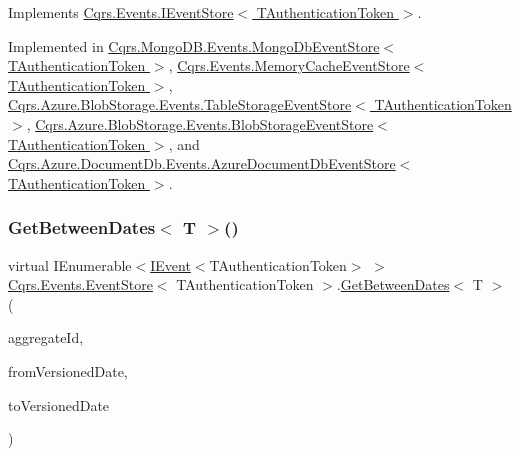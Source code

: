 Implements \hyperlink{interfaceCqrs_1_1Events_1_1IEventStore_a0575ba2cce945342dc261eb2286c8a41_a0575ba2cce945342dc261eb2286c8a41}{Cqrs.\+Events.\+I\+Event\+Store$<$ T\+Authentication\+Token $>$}.



Implemented in \hyperlink{classCqrs_1_1MongoDB_1_1Events_1_1MongoDbEventStore_a95637f6bebb94d505a6b3020275cfdf9_a95637f6bebb94d505a6b3020275cfdf9}{Cqrs.\+Mongo\+D\+B.\+Events.\+Mongo\+Db\+Event\+Store$<$ T\+Authentication\+Token $>$}, \hyperlink{classCqrs_1_1Events_1_1MemoryCacheEventStore_ac57321649252167214d1661a578c6421_ac57321649252167214d1661a578c6421}{Cqrs.\+Events.\+Memory\+Cache\+Event\+Store$<$ T\+Authentication\+Token $>$}, \hyperlink{classCqrs_1_1Azure_1_1BlobStorage_1_1Events_1_1TableStorageEventStore_a715c0d5258d8a9203f68a1070420fb7b_a715c0d5258d8a9203f68a1070420fb7b}{Cqrs.\+Azure.\+Blob\+Storage.\+Events.\+Table\+Storage\+Event\+Store$<$ T\+Authentication\+Token $>$}, \hyperlink{classCqrs_1_1Azure_1_1BlobStorage_1_1Events_1_1BlobStorageEventStore_acbb5dac5daaf2eafbf76ab631e7827f8_acbb5dac5daaf2eafbf76ab631e7827f8}{Cqrs.\+Azure.\+Blob\+Storage.\+Events.\+Blob\+Storage\+Event\+Store$<$ T\+Authentication\+Token $>$}, and \hyperlink{classCqrs_1_1Azure_1_1DocumentDb_1_1Events_1_1AzureDocumentDbEventStore_aae5f14188f0486b70dc9cdb577b15e1c_aae5f14188f0486b70dc9cdb577b15e1c}{Cqrs.\+Azure.\+Document\+Db.\+Events.\+Azure\+Document\+Db\+Event\+Store$<$ T\+Authentication\+Token $>$}.

\mbox{\label{classCqrs_1_1Events_1_1EventStore_a273b6bf609a82564fda68380d381209e_a273b6bf609a82564fda68380d381209e}} 
\subsubsection{\texorpdfstring{Get\+Between\+Dates$<$ T $>$()}{GetBetweenDates< T >()}}
{\footnotesize\ttfamily virtual I\+Enumerable$<$\hyperlink{interfaceCqrs_1_1Events_1_1IEvent}{I\+Event}$<$T\+Authentication\+Token$>$ $>$ \hyperlink{classCqrs_1_1Events_1_1EventStore}{Cqrs.\+Events.\+Event\+Store}$<$ T\+Authentication\+Token $>$.\hyperlink{classCqrs_1_1Events_1_1EventStore_add415731fcea6a9367e1031c4608c922_add415731fcea6a9367e1031c4608c922}{Get\+Between\+Dates}$<$ T $>$ (\begin{DoxyParamCaption}\item[{Guid}]{aggregate\+Id,  }\item[{Date\+Time}]{from\+Versioned\+Date,  }\item[{Date\+Time}]{to\+Versioned\+Date }\end{DoxyParamCaption})\hspace{0.3cm}{\ttfamily [virtual]}}



